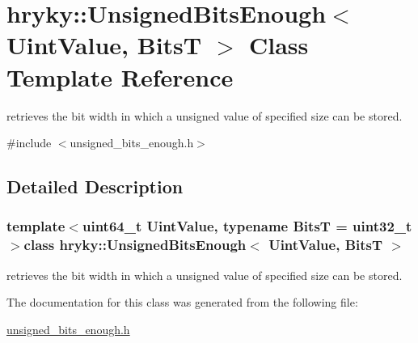 \hypertarget{classhryky_1_1_unsigned_bits_enough}{\section{hryky\-:\-:Unsigned\-Bits\-Enough$<$ Uint\-Value, Bits\-T $>$ Class Template Reference}
\label{classhryky_1_1_unsigned_bits_enough}
}


retrieves the bit width in which a unsigned value of specified size can be stored.  




{\ttfamily \#include $<$unsigned\-\_\-bits\-\_\-enough.\-h$>$}



\subsection{Detailed Description}
\subsubsection*{template$<$uint64\-\_\-t Uint\-Value, typename Bits\-T = uint32\-\_\-t$>$class hryky\-::\-Unsigned\-Bits\-Enough$<$ Uint\-Value, Bits\-T $>$}

retrieves the bit width in which a unsigned value of specified size can be stored. 

The documentation for this class was generated from the following file\-:\begin{DoxyCompactItemize}
\item 
\hyperlink{unsigned__bits__enough_8h}{unsigned\-\_\-bits\-\_\-enough.\-h}\end{DoxyCompactItemize}
